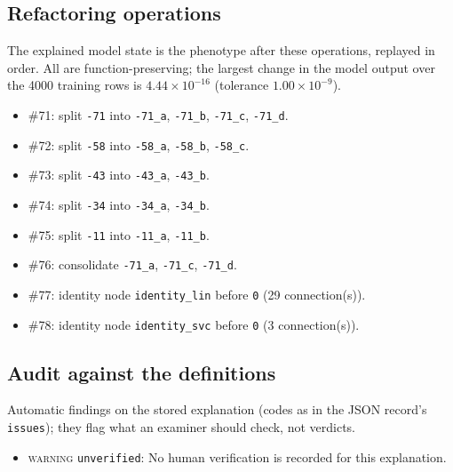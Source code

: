 \begin{drafted}
\subsection{Refactoring operations}\label{app:churn100-s4-c2:operations}
The explained model state is the phenotype after these operations, replayed in order. All are function-preserving; the largest change in the model output over the 4000 training rows is $4.44\times 10^{-16}$ (tolerance $1.00\times 10^{-9}$).
\begin{itemize}
\item \#71: split \texttt{-71} into \texttt{-71\_\allowbreak{}a}, \texttt{-71\_\allowbreak{}b}, \texttt{-71\_\allowbreak{}c}, \texttt{-71\_\allowbreak{}d}.
\item \#72: split \texttt{-58} into \texttt{-58\_\allowbreak{}a}, \texttt{-58\_\allowbreak{}b}, \texttt{-58\_\allowbreak{}c}.
\item \#73: split \texttt{-43} into \texttt{-43\_\allowbreak{}a}, \texttt{-43\_\allowbreak{}b}.
\item \#74: split \texttt{-34} into \texttt{-34\_\allowbreak{}a}, \texttt{-34\_\allowbreak{}b}.
\item \#75: split \texttt{-11} into \texttt{-11\_\allowbreak{}a}, \texttt{-11\_\allowbreak{}b}.
\item \#76: consolidate \texttt{-71\_\allowbreak{}a}, \texttt{-71\_\allowbreak{}c}, \texttt{-71\_\allowbreak{}d}.
\item \#77: identity node \texttt{identity\_\allowbreak{}lin} before \texttt{0} (29 connection(s)).
\item \#78: identity node \texttt{identity\_\allowbreak{}svc} before \texttt{0} (3 connection(s)).
\end{itemize}
\subsection{Audit against the definitions}\label{app:churn100-s4-c2:audit}
Automatic findings on the stored explanation (codes as in the JSON record's \texttt{issues}); they flag what an examiner should check, not verdicts.
\begin{itemize}
\item \textsc{warning} \texttt{unverified}: No human verification is recorded for this explanation.
\end{itemize}
\end{drafted}
